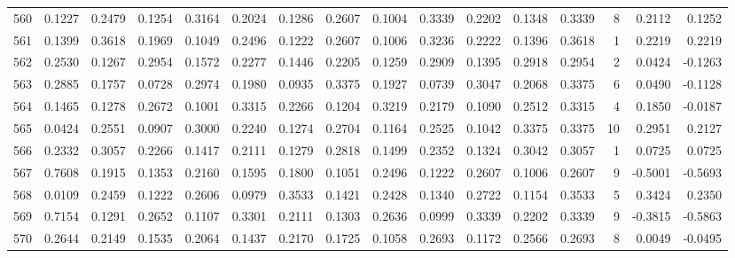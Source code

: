 \begin{tabular}{lrrrrrrrrrrrrrrr}
560 &      0.1227 &  0.2479 &  0.1254 &  0.3164 &  0.2024 &  0.1286 &  0.2607 &  0.1004 &  0.3339 &  0.2202 &   0.1348 &     0.3339 &      8 &                    0.2112 &                     0.1252 \\
561 &      0.1399 &  0.3618 &  0.1969 &  0.1049 &  0.2496 &  0.1222 &  0.2607 &  0.1006 &  0.3236 &  0.2222 &   0.1396 &     0.3618 &      1 &                    0.2219 &                     0.2219 \\
562 &      0.2530 &  0.1267 &  0.2954 &  0.1572 &  0.2277 &  0.1446 &  0.2205 &  0.1259 &  0.2909 &  0.1395 &   0.2918 &     0.2954 &      2 &                    0.0424 &                    -0.1263 \\
563 &      0.2885 &  0.1757 &  0.0728 &  0.2974 &  0.1980 &  0.0935 &  0.3375 &  0.1927 &  0.0739 &  0.3047 &   0.2068 &     0.3375 &      6 &                    0.0490 &                    -0.1128 \\
564 &      0.1465 &  0.1278 &  0.2672 &  0.1001 &  0.3315 &  0.2266 &  0.1204 &  0.3219 &  0.2179 &  0.1090 &   0.2512 &     0.3315 &      4 &                    0.1850 &                    -0.0187 \\
565 &      0.0424 &  0.2551 &  0.0907 &  0.3000 &  0.2240 &  0.1274 &  0.2704 &  0.1164 &  0.2525 &  0.1042 &   0.3375 &     0.3375 &     10 &                    0.2951 &                     0.2127 \\
566 &      0.2332 &  0.3057 &  0.2266 &  0.1417 &  0.2111 &  0.1279 &  0.2818 &  0.1499 &  0.2352 &  0.1324 &   0.3042 &     0.3057 &      1 &                    0.0725 &                     0.0725 \\
567 &      0.7608 &  0.1915 &  0.1353 &  0.2160 &  0.1595 &  0.1800 &  0.1051 &  0.2496 &  0.1222 &  0.2607 &   0.1006 &     0.2607 &      9 &                   -0.5001 &                    -0.5693 \\
568 &      0.0109 &  0.2459 &  0.1222 &  0.2606 &  0.0979 &  0.3533 &  0.1421 &  0.2428 &  0.1340 &  0.2722 &   0.1154 &     0.3533 &      5 &                    0.3424 &                     0.2350 \\
569 &      0.7154 &  0.1291 &  0.2652 &  0.1107 &  0.3301 &  0.2111 &  0.1303 &  0.2636 &  0.0999 &  0.3339 &   0.2202 &     0.3339 &      9 &                   -0.3815 &                    -0.5863 \\
570 &      0.2644 &  0.2149 &  0.1535 &  0.2064 &  0.1437 &  0.2170 &  0.1725 &  0.1058 &  0.2693 &  0.1172 &   0.2566 &     0.2693 &      8 &                    0.0049 &                    -0.0495 \\

\end{tabular}
